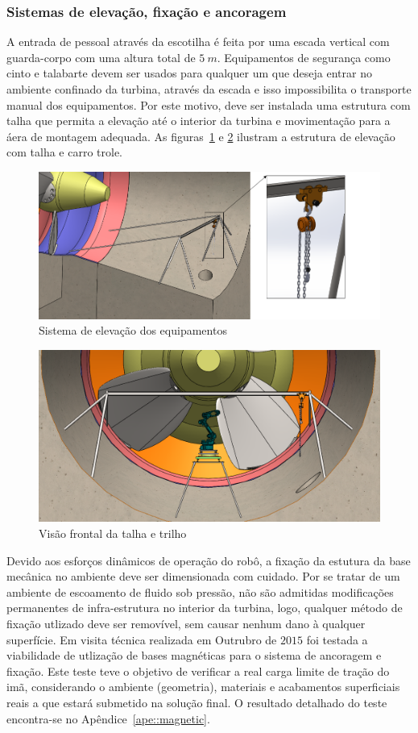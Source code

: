 \subsubsection{Sistemas de elevação, fixação e ancoragem}
A entrada de pessoal através da escotilha é feita por uma escada vertical com
guarda-corpo com uma altura total de $5~m$. Equipamentos de segurança como
cinto e talabarte devem ser usados para qualquer um que deseja entrar no
ambiente confinado da turbina, através da escada e isso impossibilita o
transporte manual dos equipamentos. Por este motivo, deve ser instalada uma
estrutura com talha que permita a elevação até o interior da turbina e
movimentação para a áera de montagem adequada. As figuras~\ref{fig::talha} e
\ref{fig::talha_trilho} ilustram a estrutura de elevação com talha e carro
trole. 
  
\begin{figure}[h!]
   \centering
   \includegraphics[width=0.8\columnwidth]{figs/bases/talha}
   \caption{Sistema de elevação dos equipamentos}
   \label{fig::talha}
\end{figure}

\begin{figure}[h!]
   \centering
   \includegraphics[width=0.8\columnwidth]{figs/bases/talha_trilho}
   \caption{Visão frontal da talha e trilho}
   \label{fig::talha_trilho}
\end{figure}

Devido aos esforços dinâmicos de operação do robô, a fixação da estutura da
base mecânica no ambiente deve ser dimensionada com cuidado. Por se
tratar de um ambiente de escoamento de fluido sob pressão, não são admitidas
modificações permanentes de infra-estrutura no interior da turbina, logo,
qualquer método de fixação utlizado deve ser removível, sem causar nenhum dano
à qualquer superfície. Em visita técnica realizada em Outrubro de $2015$ foi
testada a viabilidade de utlização de bases magnéticas para o sistema de
ancoragem e fixação. Este teste teve o objetivo de verificar a real carga limite de tração
do imã, considerando o ambiente (geometria), materiais e acabamentos
superficiais reais a que estará submetido na solução final. O resultado
detalhado do teste encontra-se no Apêndice~\ref{ape::magnetic}.

